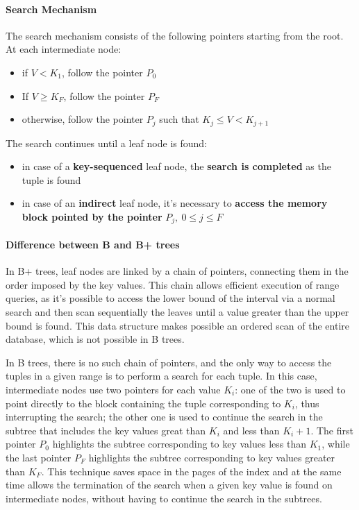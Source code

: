 \documentclass[english]{article}
\begin{document}
\paragraph{Search Mechanism}

The search mechanism consists of the following pointers starting from the root.
At each intermediate node:

\begin{itemize}
  \item if \(V < K_1\), follow the pointer \(P_0\)
  \item If \(V \geq K_F\), follow the pointer \(P_F\)
  \item otherwise, follow the pointer \(P_j\) such that \(K_j \leq V < K_{j + 1}\)
\end{itemize}

The search continues until a leaf node is found:

\begin{itemize}
  \item in case of a \textbf{key-sequenced} leaf node, the \textbf{search is completed} as the tuple is found
  \item in case of an \textbf{indirect} leaf node, it's necessary to \textbf{access the memory block pointed by the pointer} \(P_j, \ 0 \leq j \leq F\)
\end{itemize}

\paragraph{Difference between B and B+ trees}

In B+ trees, leaf nodes are linked by a chain of pointers, connecting them in the order imposed by the key values.
This chain allows efficient execution of range queries, as it's possible to access the lower bound of the interval via a normal search and then scan sequentially the leaves until a value greater than the upper bound is found.
This data structure makes possible an ordered scan of the entire database, which is not possible in B trees.

In B trees, there is no such chain of pointers, and the only way to access the tuples in a given range is to perform a search for each tuple.
In this case, intermediate nodes use two pointers for each value \(K_i\):
one of the two is used to point directly to the block containing the tuple corresponding to \(K_i\), thus interrupting the search;
the other one is used to continue the search in the subtree that includes the key values great than \(K_i\) and less than \(K_i + 1\).
The first pointer \(P_0\) highlights the subtree corresponding to key values less than \(K_1\), while the last pointer \(P_F\) highlights the subtree corresponding to key values greater than \(K_F\).
This technique saves space in the pages of the index and at the same time allows the termination of the search when a given key value is found on intermediate nodes, without having to continue the search in the subtrees.
\end{document}
